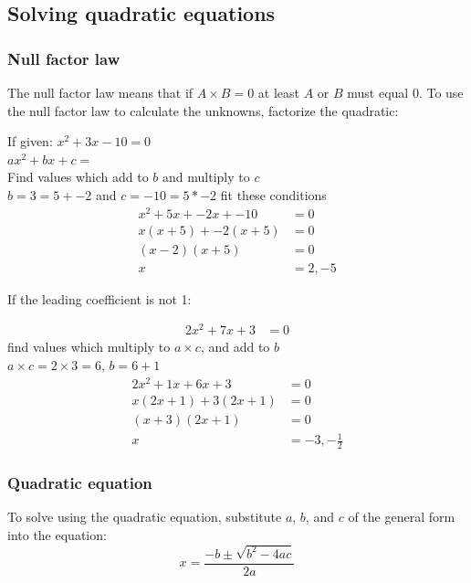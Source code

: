 \documentclass[a4paper,10pt]{report}
\begin{document}
\subsection{Solving quadratic equations}
\subsubsection{Null factor law}
The null factor law means that if $A \times B = 0$ at least $A$ or $B$ must equal 0.
To use the null factor law to calculate the unknowns, factorize the quadratic:
\begin{center}
	If given: $x^2 + 3x - 10 = 0$\\
	$ax^2 + bx + c = $\\
	Find values which add to $b$ and multiply to $c$\\
	$b = 3 = 5 + -2$ and $c = -10 = 5 * -2$ fit these conditions
	\begin{align*}
		x^2 + 5x + -2x + -10 & = 0     \\
		x(x + 5) + -2(x + 5) & = 0     \\
		(x - 2)(x + 5)       & = 0     \\
		x                    & = 2, -5
	\end{align*}
\end{center}

If the leading coefficient is not 1:
\begin{center}
	\begin{align*}
		2x^2 + 7x + 3 & = 0
	\end{align*}
	find values which multiply to $a \times c$, and add to $b$\\
	$a \times c = 2 \times 3 = 6$, $b = 6 + 1$
	\begin{align*}
		2x^2 + 1x + 6x + 3    & = 0                \\
		x(2x + 1) + 3(2x + 1) & = 0                \\
		(x + 3)(2x + 1)       & = 0                \\
		x                     & = -3, -\frac{1}{2}
	\end{align*}
\end{center}

\subsubsection{Quadratic equation}
To solve using the quadratic equation, substitute $a$, $b$, and $c$ of the general form into the equation:
$$
	x = \frac{-b \pm \sqrt{b^2 - 4ac}}{2a}
$$
\end{document}
